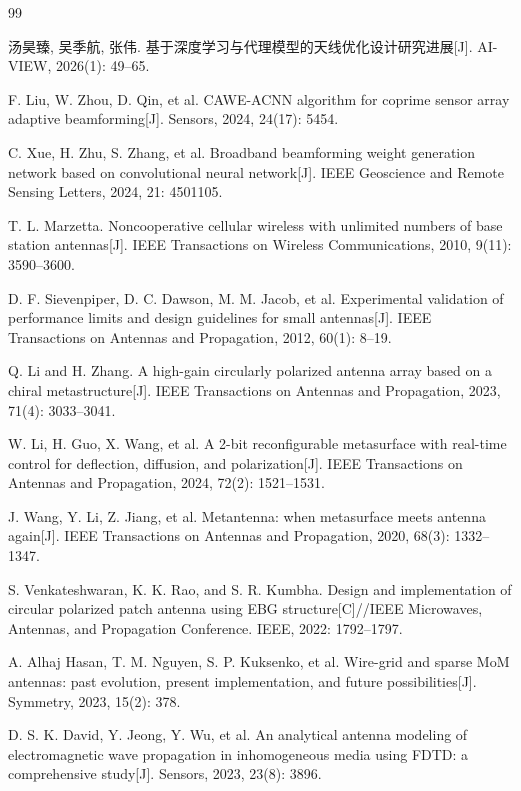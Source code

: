 \documentclass[UTF8,a4paper,12pt]{ctexart}
\begin{document}
\begin{thebibliography}{99}

 汤昊臻, 吴季航, 张伟. 基于深度学习与代理模型的天线优化设计研究进展[J]. AI-VIEW, 2026(1): 49--65.

 F. Liu, W. Zhou, D. Qin, et al. CAWE-ACNN algorithm for coprime sensor array adaptive beamforming[J]. Sensors, 2024, 24(17): 5454.

 C. Xue, H. Zhu, S. Zhang, et al. Broadband beamforming weight generation network based on convolutional neural network[J]. IEEE Geoscience and Remote Sensing Letters, 2024, 21: 4501105.

 T. L. Marzetta. Noncooperative cellular wireless with unlimited numbers of base station antennas[J]. IEEE Transactions on Wireless Communications, 2010, 9(11): 3590--3600.

 D. F. Sievenpiper, D. C. Dawson, M. M. Jacob, et al. Experimental validation of performance limits and design guidelines for small antennas[J]. IEEE Transactions on Antennas and Propagation, 2012, 60(1): 8--19.

 Q. Li and H. Zhang. A high-gain circularly polarized antenna array based on a chiral metastructure[J]. IEEE Transactions on Antennas and Propagation, 2023, 71(4): 3033--3041.

 W. Li, H. Guo, X. Wang, et al. A 2-bit reconfigurable metasurface with real-time control for deflection, diffusion, and polarization[J]. IEEE Transactions on Antennas and Propagation, 2024, 72(2): 1521--1531.

 J. Wang, Y. Li, Z. Jiang, et al. Metantenna: when metasurface meets antenna again[J]. IEEE Transactions on Antennas and Propagation, 2020, 68(3): 1332--1347.

 S. Venkateshwaran, K. K. Rao, and S. R. Kumbha. Design and implementation of circular polarized patch antenna using EBG structure[C]//IEEE Microwaves, Antennas, and Propagation Conference. IEEE, 2022: 1792--1797.

 A. Alhaj Hasan, T. M. Nguyen, S. P. Kuksenko, et al. Wire-grid and sparse MoM antennas: past evolution, present implementation, and future possibilities[J]. Symmetry, 2023, 15(2): 378.

 D. S. K. David, Y. Jeong, Y. Wu, et al. An analytical antenna modeling of electromagnetic wave propagation in inhomogeneous media using FDTD: a comprehensive study[J]. Sensors, 2023, 23(8): 3896.


\end{thebibliography}
\end{document}
